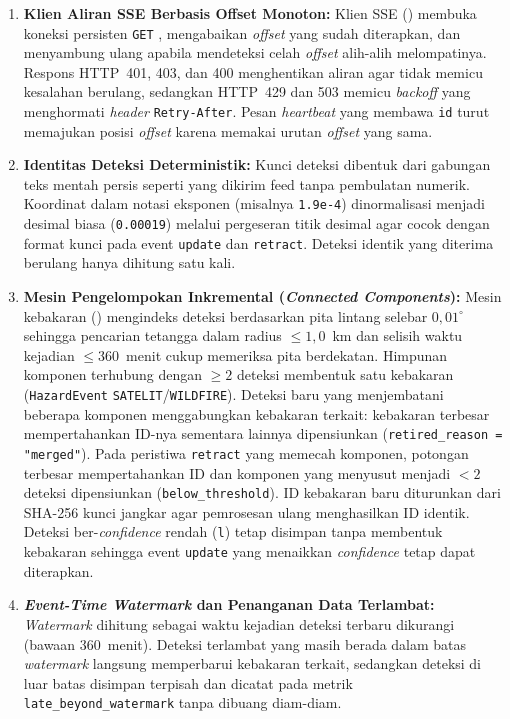 \begin{enumerate}
    \item \textbf{Klien Aliran SSE Berbasis Offset Monoton:} Klien SSE () membuka koneksi persisten \texttt{GET} , mengabaikan \textit{offset} yang sudah diterapkan, dan menyambung ulang apabila mendeteksi celah \textit{offset} alih-alih melompatinya. Respons HTTP~401, 403, dan 400 menghentikan aliran agar tidak memicu kesalahan berulang, sedangkan HTTP~429 dan 503 memicu \textit{backoff} yang menghormati \textit{header} \texttt{Retry-After}. Pesan \textit{heartbeat} yang membawa \texttt{id} turut memajukan posisi \textit{offset} karena memakai urutan \textit{offset} yang sama.
    \item \textbf{Identitas Deteksi Deterministik:} Kunci deteksi dibentuk dari gabungan teks mentah  persis seperti yang dikirim feed tanpa pembulatan numerik. Koordinat dalam notasi eksponen (misalnya \texttt{1.9e-4}) dinormalisasi menjadi desimal biasa (\texttt{0.00019}) melalui pergeseran titik desimal agar cocok dengan format kunci pada event \texttt{update} dan \texttt{retract}. Deteksi identik yang diterima berulang hanya dihitung satu kali.
    \item \textbf{Mesin Pengelompokan Inkremental (\textit{Connected Components}):} Mesin kebakaran () mengindeks deteksi berdasarkan pita lintang selebar $0,01^\circ$ sehingga pencarian tetangga dalam radius $\le 1,0$~km dan selisih waktu kejadian $\le 360$~menit cukup memeriksa pita berdekatan. Himpunan komponen terhubung dengan $\ge 2$ deteksi membentuk satu kebakaran (\texttt{HazardEvent} \texttt{SATELIT}/\texttt{WILDFIRE}). Deteksi baru yang menjembatani beberapa komponen menggabungkan kebakaran terkait: kebakaran terbesar mempertahankan ID-nya sementara lainnya dipensiunkan (\texttt{retired\_reason = "merged"}). Pada peristiwa \texttt{retract} yang memecah komponen, potongan terbesar mempertahankan ID dan komponen yang menyusut menjadi $<2$ deteksi dipensiunkan (\texttt{below\_threshold}). ID kebakaran baru diturunkan dari SHA-256 kunci jangkar agar pemrosesan ulang menghasilkan ID identik. Deteksi ber-\textit{confidence} rendah (\texttt{l}) tetap disimpan tanpa membentuk kebakaran sehingga event \texttt{update} yang menaikkan \textit{confidence} tetap dapat diterapkan.
    \item \textbf{\textit{Event-Time Watermark} dan Penanganan Data Terlambat:} \textit{Watermark} dihitung sebagai waktu kejadian deteksi terbaru dikurangi  (bawaan 360~menit). Deteksi terlambat yang masih berada dalam batas \textit{watermark} langsung memperbarui kebakaran terkait, sedangkan deteksi di luar batas disimpan terpisah dan dicatat pada metrik \texttt{late\_beyond\_watermark} tanpa dibuang diam-diam.

\end{enumerate}

